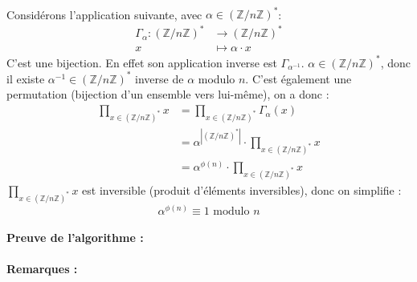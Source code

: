 			\paragraph{}Considérons l'application suivante, avec $\alpha \in (\mathbb{Z}/n\mathbb{Z})^*$:
				\begin{align*}
					\Gamma_{\alpha} \colon (\mathbb{Z}/n\mathbb{Z})^* &\to (\mathbb{Z}/n\mathbb{Z})^*\\
					x &\mapsto \alpha \cdot x
				\end{align*}
				C'est une bijection. En effet son application inverse est $\Gamma_{\alpha^{-1}}$. $\alpha \in (\mathbb{Z}/n\mathbb{Z})^*$, donc il existe $\alpha^{-1} \in (\mathbb{Z}/n\mathbb{Z})^*$ inverse de $\alpha$ modulo $n$. C'est également une permutation (bijection d'un ensemble vers lui-même), on a donc :
				\begin{align*}
					\prod_{x \in (\mathbb{Z}/n\mathbb{Z})^*} x &= \prod_{x \in (\mathbb{Z}/n\mathbb{Z})^*} \Gamma_{\alpha}(x)\\
					&= \alpha^{|(\mathbb{Z}/n\mathbb{Z})^* |} \cdot \prod_{x \in (\mathbb{Z}/n\mathbb{Z})^*} x\\
					&= \alpha^{\phi(n)} \cdot \prod_{x \in (\mathbb{Z}/n\mathbb{Z})^*} x
				\end{align*}
				$\prod_{x \in (\mathbb{Z}/n\mathbb{Z})^*} x$ est inversible (produit d'éléments inversibles), donc on simplifie :
				\[\alpha^{\phi(n)} \equiv 1 \text{ modulo } n \]
		
		\paragraph{Preuve de l'algorithme :\\}
		
		\paragraph{Remarques :\\}
		
